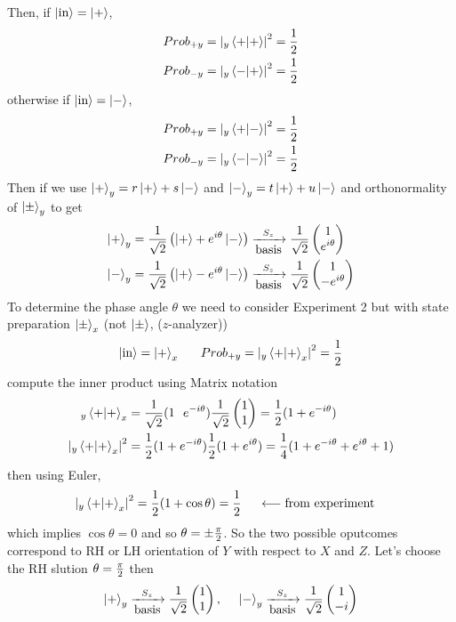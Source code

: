 \documentclass[english, 11pt]{article}
\begin{document}
          Then, if $\left|\mbox{in}\right\rangle = \left|+\right\rangle$,
          \begin{align*}
            Prob_{+y} & = \left| {}_y\braket{+}{+} \right|^2 = \f{1}{2} \\
            Prob_{-y} & = \left| {}_y\braket{-}{+} \right|^2 = \f{1}{2}
          \end{align*}
          otherwise if $\left|\mbox{in}\right\rangle = \left|-\right\rangle$,
          \begin{align*}
            Prob_{+y} & = \left| {}_y\braket{+}{-} \right|^2 = \f{1}{2} \\
            Prob_{-y} & = \left| {}_y\braket{-}{-} \right|^2 = \f{1}{2}
          \end{align*}
          Then if we use $\left|+\right\rangle_y = r\left|+\right\rangle + s\left|-\right\rangle$ and $\left|-\right\rangle_y = t\left|+\right\rangle + u\left|-\right\rangle$ and orthonormality of $\left|\pm\right\rangle_y$ to  get
          \begin{align*}
            \left|+\right\rangle_y & = \frac{1}{\sqrt{2}} \left( \left|+\right\rangle + e^{i\theta}\left|-\right\rangle \right) \xrightarrow[\mbox{basis}]{S_z}  \frac{1}{\sqrt{2}} \left(\begin{matrix}1 \\e^{i\theta}\end{matrix}\right) \\
            \left|-\right\rangle_y & = \frac{1}{\sqrt{2}} \left( \left|+\right\rangle - e^{i\theta}\left|-\right\rangle \right) \xrightarrow[\mbox{basis}]{S_z}  \frac{1}{\sqrt{2}} \left(\begin{matrix}1 \\-e^{i\theta}\end{matrix}\right)
          \end{align*}
          To determine the phase angle $\theta$ we need to consider Experiment 2 but with state preparation $\left|\pm\right\rangle_x$ (not $\left|\pm\right\rangle$, ($z$-analyzer))
          \[ \ket{\mbox{in}} = \kplx \ \ \ \ \ Prob_{+y} = \left| {}_y\braket{+}{+}_x \right|^2 = \f{1}{2} \]
          compute the inner product using Matrix notation
          \begin{align*}
            {}_y\braket{+}{+}_x & = \f{1}{\sqrt{2}}(1 \ \ e^{-i\theta})\f{1}{\sqrt{2}}\mtx{1\\1} = \f{1}{2} (1 + e^{-i\theta}) \\
            \left| {}_y\braket{+}{+}_x \right|^2 & = \f{1}{2}(1 + e^{-i\theta})\f{1}{2}(1 +  e^{i\theta}) = \f{1}{4}(1 + e^{-i\theta} + e^{i\theta} + 1)
          \end{align*}
          then using Euler,
          \begin{align*}
            \left| {}_y\braket{+}{+}_x \right|^2 & = \f{1}{2}( 1 + \cos\theta) = \f{1}{2} \ \ \ \ \longleftarrow \mbox{from experiment}
          \end{align*}
          which implies $\cos\theta = 0$ and so $\theta = \pm \frac{\pi}{2}$. So the two possible oputcomes correspond to RH or LH orientation of $Y$ with respect to $X$ and $Z$. Let's choose the RH slution $\theta = \frac{\pi}{2}$ then
          \begin{align*}
            \left|+\right\rangle_y \xrightarrow[\mbox{basis}]{S_z} \frac{1}{\sqrt{2}} \left(\begin{matrix}1 \\ 1\end{matrix}\right), \ \ \ \ \left|-\right\rangle_y \xrightarrow[\mbox{basis}]{S_z} \frac{1}{\sqrt{2}} \left(\begin{matrix}1 \\ -i\end{matrix}\right)
          \end{align*}
\end{document}
